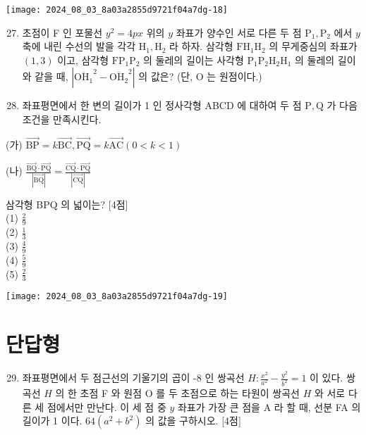 \documentclass[10pt]{article}
\begin{document}
\begin{center}
\texttt{[image: 2024\_08\_03\_8a03a2855d9721f04a7dg-18]}
\end{center}

\begin{enumerate}
  \setcounter{enumi}{26}
  \item 초점이 F 인 포물선 \(y^{2}=4 p x\) 위의 \(y\) 좌표가 양수인 서로 다른 두 점 \(\mathrm{P}_{1}, \mathrm{P}_{2}\) 에서 \(y\) 축에 내린 수선의 발을 각각 \(\mathrm{H}_{1}, \mathrm{H}_{2}\) 라 하자. 삼각형 \(\mathrm{FH}_{1} \mathrm{H}_{2}\) 의 무게중심의 좌표가 \((1,3)\) 이고, 삼각형 \(\mathrm{FP}_{1} \mathrm{P}_{2}\) 의 둘레의 길이는 사각형 \(\mathrm{P}_{1} \mathrm{P}_{2} \mathrm{H}_{2} \mathrm{H}_{1}\) 의 둘레의 길이와 같을 때, \(\left|{\overline{\mathrm{OH}_{1}}}^{2}-{\overline{\mathrm{OH}_{2}}}^{2}\right|\) 의 값은? (단, O 는 원점이다.)
  \item 좌표평면에서 한 변의 길이가 1 인 정사각형 ABCD 에 대하여 두 점 \(\mathrm{P}, \mathrm{Q}\) 가 다음 조건을 만족시킨다.
\end{enumerate}

(가) \(\overrightarrow{\mathrm{BP}}=k \overrightarrow{\mathrm{BC}}, \overrightarrow{\mathrm{PQ}}=k \overrightarrow{\mathrm{AC}}(0<k<1)\)

(나) \(\frac{\overrightarrow{\mathrm{BQ}} \cdot \overrightarrow{\mathrm{PQ}}}{|\overrightarrow{\mathrm{BQ}}|}=\frac{\overrightarrow{\mathrm{CQ}} \cdot \overrightarrow{\mathrm{PQ}}}{|\overrightarrow{\mathrm{CQ}}|}\)

삼각형 BPQ 의 넓이는? [4점]\\
(1) \(\frac{2}{9}\)\\
(2) \(\frac{1}{3}\)\\
(3) \(\frac{4}{9}\)\\
(4) \(\frac{5}{9}\)\\
(5) \(\frac{2}{3}\)

\begin{center}
\texttt{[image: 2024\_08\_03\_8a03a2855d9721f04a7dg-19]}
\end{center}

\section*{단답형}
\begin{enumerate}
  \setcounter{enumi}{28}
  \item 좌표평면에서 두 점근선의 기울기의 곱이 -8 인 쌍곡선 \(H: \frac{x^{2}}{a^{2}}-\frac{y^{2}}{b^{2}}=1\) 이 있다. 쌍곡선 \(H\) 의 한 초점 F 와 원점 O 를 두 초점으로 하는 타원이 쌍곡선 \(H\) 와 서로 다른 세 점에서만 만난다. 이 세 점 중 \(y\) 좌표가 가장 큰 점을 A 라 할 때, 선분 FA 의 길이가 1 이다. \(64\left(a^{2}+b^{2}\right)\) 의 값을 구하시오. [4점]
\end{enumerate}
\end{document}
